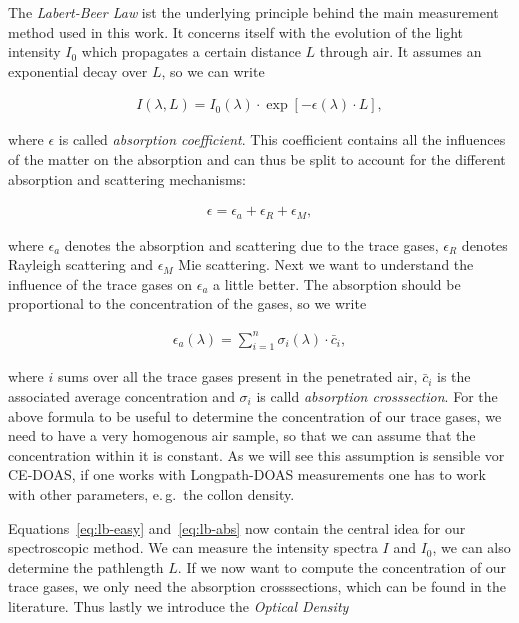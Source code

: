 The \emph{Labert-Beer Law} ist the underlying principle behind the
main measurement method used in this work. It concerns itself with the
evolution of the light intensity $I_0$ which propagates a certain
distance $L$ through air. It assumes an exponential decay over $L$, so
we can write

\begin{align}
  I(\lambda, L) = I_0(\lambda) \cdot \exp[-\epsilon(\lambda) \cdot
  L], \label{eq:lb-easy}
\end{align}

where $\epsilon$ is called \emph{absorption coefficient}. This
coefficient contains all the influences of the matter on the
absorption and can thus be split to account for the different
absorption and scattering mechanisms:

\begin{align*}
  \epsilon = \epsilon_a + \epsilon_R + \epsilon_M,
\end{align*}

where $\epsilon_a$ denotes the absorption and scattering due to the
trace gases, $\epsilon_R$ denotes Rayleigh scattering and $\epsilon_M$
Mie scattering. Next we want to understand the influence of the trace
gases on $\epsilon_a$ a little better. The absorption should be
proportional to the concentration of the gases, so we write

\begin{align}
  \epsilon_a(\lambda) = \sum_{i=1}^n \sigma_i(\lambda) \cdot \bar c_i, \label{eq:lb-abs}
\end{align}

where $i$ sums over all the trace gases present in the penetrated
air, $\bar c_i$ is the associated average concentration and $\sigma_i$
is calld \emph{absorption crosssection}. For the above formula to be
useful to determine the concentration of our trace gases, we need to
have a very homogenous air sample, so that we can assume that the
concentration within it is constant. As we will see this assumption is
sensible vor CE-DOAS, if one works with Longpath-DOAS measurements one
has to work with other parameters, e.\,g.\ the collon density.

Equations~\eqref{eq:lb-easy} and~\eqref{eq:lb-abs} now contain the central idea for our
spectroscopic method. We can measure the intensity spectra $I$ and
$I_0$, we can also determine the pathlength $L$. If we now want to
compute the concentration of our trace gases, we only need the
absorption crosssections, which can be found in the
literature. Thus lastly we introduce the \emph{Optical
  Density} 

